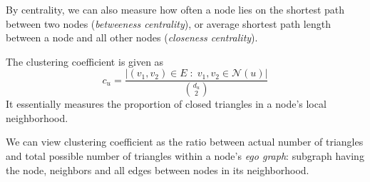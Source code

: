 By centrality, we can also measure how often a node lies on the shortest path between two nodes (\textit{betweeness centrality}), or average shortest path length between a node and all other nodes (\textit{closeness centrality}).
\begin{definition}
The clustering coefficient \cite{small-world-dynamics} is given as
\begin{equation}
	c_u = \dfrac{|(v_1, v_2) \in E \; : \; v_1, v_2 \in \mathcal{N}(u)|}{{d_u \choose 2}}
\end{equation}	
It essentially measures the proportion of closed triangles in a node's local neighborhood.
\end{definition}
We can view clustering coefficient as the ratio between actual number of triangles and total possible number of triangles within a node's \textit{ego graph}: subgraph having the node, neighbors and all edges between nodes in its neighborhood.
